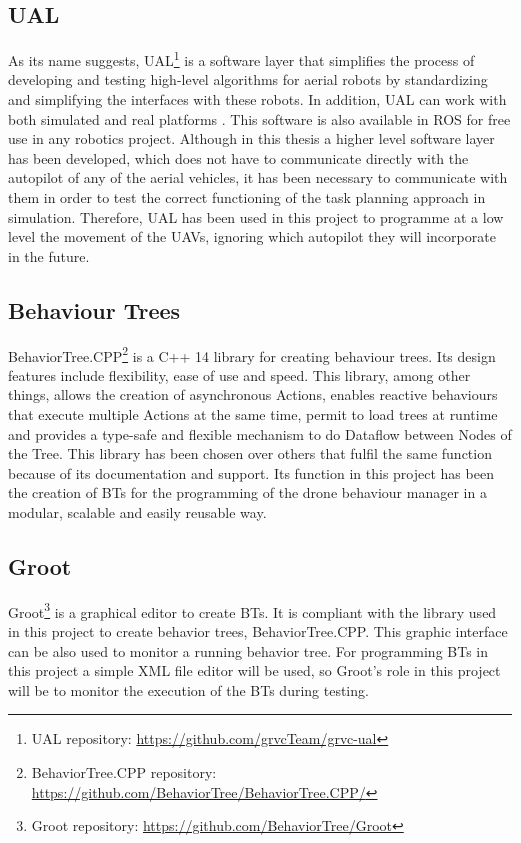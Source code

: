\subsection{UAL}
\label{subsec:UAL}
As its name suggests, \gls{UAL}\footnote{UAL repository: \url{https://github.com/grvcTeam/grvc-ual}} is a software layer that simplifies the process of developing and testing high-level algorithms for aerial robots by standardizing and simplifying the interfaces with these robots. In addition, \gls{UAL} can work with both simulated and real platforms \cite{real_ijars20}. This software is also available in \gls{ROS} for free use in any robotics project. Although in this thesis a higher level software layer has been developed, which does not have to communicate directly with the autopilot of any of the aerial vehicles, it has been necessary to communicate with them in order to test the correct functioning of the task planning approach in simulation. Therefore, \gls{UAL} has been used in this project to programme at a low level the movement of the \glspl{UAV}, ignoring which autopilot they will incorporate in the future.

\subsection{Behaviour Trees}
\label{subsec:BehaviourTrees}
BehaviorTree.CPP\footnote{BehaviorTree.CPP repository: \url{https://github.com/BehaviorTree/BehaviorTree.CPP/}} is a C++ 14 library for creating behaviour trees. Its design features include flexibility, ease of use and speed. This library, among other things, allows the creation of asynchronous Actions, enables reactive behaviours that execute multiple Actions at the same time, permit to load trees at runtime and provides a type-safe and flexible mechanism to do Dataflow between Nodes of the Tree. This library has been chosen over others that fulfil the same function because of its documentation and support. Its function in this project has been the creation of \glspl{BT} for the programming of the drone behaviour manager in a modular, scalable and easily reusable way.

\subsection{Groot}
\label{subsec:Groot}
Groot\footnote{Groot repository: \url{https://github.com/BehaviorTree/Groot}} is a graphical editor to create \glspl{BT}. It is compliant with the library used in this project to create behavior trees, BehaviorTree.CPP. This graphic interface can be also used to monitor a running behavior tree. For programming \glspl{BT} in this project a simple XML file editor will be used, so Groot's role in this project will be to monitor the execution of the \glspl{BT} during testing.

